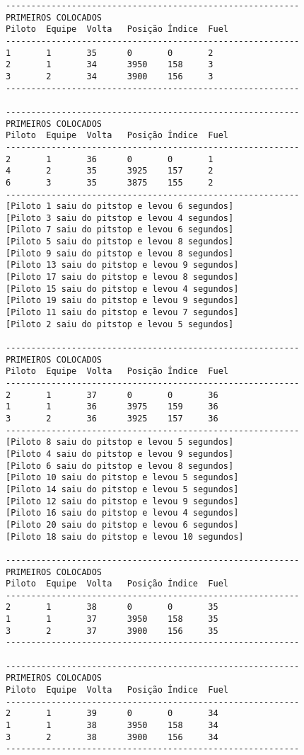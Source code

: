 \documentclass[12pt]{article}
\begin{document}
\begin{verbatim}
----------------------------------------------------------
PRIMEIROS COLOCADOS
Piloto  Equipe  Volta   Posição Índice  Fuel
----------------------------------------------------------
1       1       35      0       0       2
2       1       34      3950    158     3
3       2       34      3900    156     3
----------------------------------------------------------

----------------------------------------------------------
PRIMEIROS COLOCADOS
Piloto  Equipe  Volta   Posição Índice  Fuel
----------------------------------------------------------
2       1       36      0       0       1
4       2       35      3925    157     2
6       3       35      3875    155     2
----------------------------------------------------------
[Piloto 1 saiu do pitstop e levou 6 segundos]
[Piloto 3 saiu do pitstop e levou 4 segundos]
[Piloto 7 saiu do pitstop e levou 6 segundos]
[Piloto 5 saiu do pitstop e levou 8 segundos]
[Piloto 9 saiu do pitstop e levou 8 segundos]
[Piloto 13 saiu do pitstop e levou 9 segundos]
[Piloto 17 saiu do pitstop e levou 8 segundos]
[Piloto 15 saiu do pitstop e levou 4 segundos]
[Piloto 19 saiu do pitstop e levou 9 segundos]
[Piloto 11 saiu do pitstop e levou 7 segundos]
[Piloto 2 saiu do pitstop e levou 5 segundos]

----------------------------------------------------------
PRIMEIROS COLOCADOS
Piloto  Equipe  Volta   Posição Índice  Fuel
----------------------------------------------------------
2       1       37      0       0       36
1       1       36      3975    159     36
3       2       36      3925    157     36
----------------------------------------------------------
[Piloto 8 saiu do pitstop e levou 5 segundos]
[Piloto 4 saiu do pitstop e levou 9 segundos]
[Piloto 6 saiu do pitstop e levou 8 segundos]
[Piloto 10 saiu do pitstop e levou 5 segundos]
[Piloto 14 saiu do pitstop e levou 5 segundos]
[Piloto 12 saiu do pitstop e levou 9 segundos]
[Piloto 16 saiu do pitstop e levou 4 segundos]
[Piloto 20 saiu do pitstop e levou 6 segundos]
[Piloto 18 saiu do pitstop e levou 10 segundos]

----------------------------------------------------------
PRIMEIROS COLOCADOS
Piloto  Equipe  Volta   Posição Índice  Fuel
----------------------------------------------------------
2       1       38      0       0       35
1       1       37      3950    158     35
3       2       37      3900    156     35
----------------------------------------------------------

----------------------------------------------------------
PRIMEIROS COLOCADOS
Piloto  Equipe  Volta   Posição Índice  Fuel
----------------------------------------------------------
2       1       39      0       0       34
1       1       38      3950    158     34
3       2       38      3900    156     34
----------------------------------------------------------


\end{verbatim}
\end{document}
